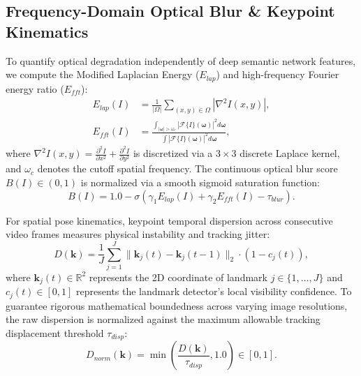 \documentclass[conference]{IEEEtran}
\begin{document}
\subsection{Frequency-Domain Optical Blur \& Keypoint Kinematics}
To quantify optical degradation independently of deep semantic network features, we compute the Modified Laplacian Energy ($E_{lap}$) and high-frequency Fourier energy ratio ($E_{fft}$):
\begin{align}
E_{lap}(I) &= \frac{1}{|\Omega|} \sum_{(x,y) \in \Omega} |\nabla^2 I(x,y)|, \\
E_{fft}(I) &= \frac{\int_{|\boldsymbol{\omega}| > \omega_c} |\mathcal{F}\{I\}(\boldsymbol{\omega})|^2 d\boldsymbol{\omega}}{\int |\mathcal{F}\{I\}(\boldsymbol{\omega})|^2 d\boldsymbol{\omega}},
\end{align}
where $\nabla^2 I(x, y) = \frac{\partial^2 I}{\partial x^2} + \frac{\partial^2 I}{\partial y^2}$ is discretized via a $3 \times 3$ discrete Laplace kernel, and $\omega_c$ denotes the cutoff spatial frequency. The continuous optical blur score $B(I) \in (0, 1)$ is normalized via a smooth sigmoid saturation function:
\begin{equation}
B(I) = 1.0 - \sigma\left( \gamma_1 E_{lap}(I) + \gamma_2 E_{fft}(I) - \tau_{blur} \right).
\end{equation}

For spatial pose kinematics, keypoint temporal dispersion across consecutive video frames measures physical instability and tracking jitter:
\begin{equation}
D(\mathbf{k}) = \frac{1}{J} \sum_{j=1}^J \|\mathbf{k}_j(t) - \mathbf{k}_j(t-1)\|_2 \cdot (1 - c_j(t)),
\end{equation}
where $\mathbf{k}_j(t) \in \mathbb{R}^2$ represents the 2D coordinate of landmark $j \in \{1, \dots, J\}$ and $c_j(t) \in [0, 1]$ represents the landmark detector's local visibility confidence. To guarantee rigorous mathematical boundedness across varying image resolutions, the raw dispersion is normalized against the maximum allowable tracking displacement threshold $\tau_{disp}$:
\begin{equation}
D_{norm}(\mathbf{k}) = \min\left( \frac{D(\mathbf{k})}{\tau_{disp}}, 1.0 \right) \in [0, 1].
\end{equation}
\end{document}
